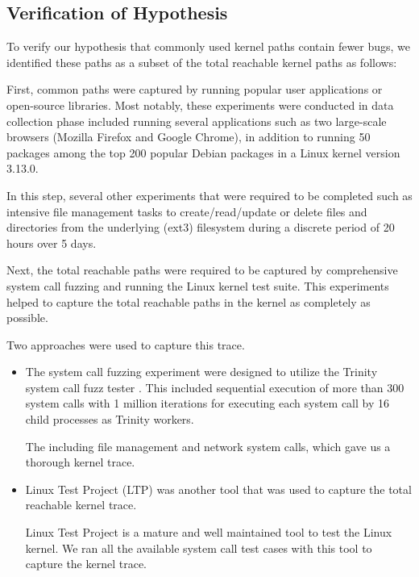 \subsection{Verification of Hypothesis}

To verify our hypothesis that commonly used kernel paths contain fewer bugs, 
we identified these paths as a subset of the total reachable kernel
paths as follows:

First, common paths were captured by running popular user applications or open-source libraries. Most notably, these experiments were conducted in data collection phase included running several applications such as two large-scale browsers (Mozilla Firefox and Google Chrome), in addition to running 50 packages among the top 200 popular Debian packages \cite{Top-Packages} in a Linux kernel version 3.13.0.
  

In this step, several other experiments that were required to be completed such as intensive file management tasks to create/read/update or delete files and directories from the underlying (ext3) filesystem during a discrete period of 20 hours over 5 days.

Next, the total reachable paths were required to be captured by comprehensive system call fuzzing and running the Linux kernel test suite. This experiments helped to capture the total reachable paths in the kernel as completely  as possible. 

Two approaches were used to capture this trace.

\begin{itemize}
\item The system call fuzzing experiment were designed to utilize the Trinity system call fuzz tester \cite{Trinity}. This included sequential execution of more than 300 system calls with 1 million iterations for executing each system call by 16 child processes as Trinity workers.

The including file management and network system calls,  which gave us a thorough kernel trace. 

\item Linux Test Project (LTP) \cite{LTP} was another tool that was used to capture the total reachable kernel trace.

Linux Test Project is a mature and well maintained tool to test the Linux
kernel. 
We ran all the available system call test cases with this tool to capture
the kernel trace. 
\end{itemize}

